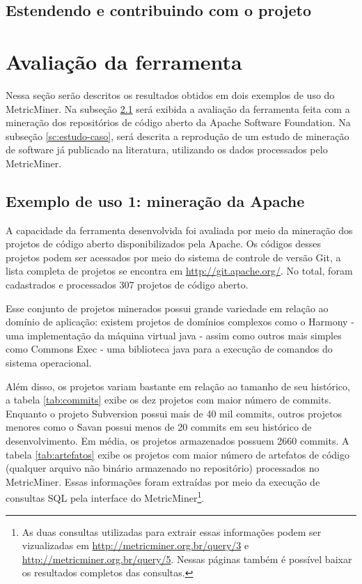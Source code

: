 \documentclass[a4paper, 12pt, twoside]{book}
\begin{document}
    \section{Estendendo e contribuindo com o projeto}

    
\chapter{Avaliação da ferramenta} \label{ch:avaliacao}
    
    Nessa seção serão descritos os resultados obtidos em dois exemplos de uso do MetricMiner. Na subseção \ref{sc:apache} será exibida a avaliação da ferramenta feita com a mineração dos repositórios de código aberto da Apache Software Foundation. Na subseção \ref{sc:estudo-caso}, será descrita a reprodução de um estudo de mineração de software já publicado na literatura, utilizando os dados processados pelo MetricMiner.

    \section{Exemplo de uso 1: mineração da Apache} \label{sc:apache}

        A capacidade da ferramenta desenvolvida foi avaliada por meio da mineração dos projetos de código aberto disponibilizados pela Apache. Os códigos desses projetos podem ser acessados por meio do sistema de controle de versão Git, a lista completa de projetos se encontra em \url{http://git.apache.org/}. No total, foram cadastrados e processados 307 projetos de código aberto.

        Esse conjunto de projetos minerados possui grande variedade em relação ao domínio de aplicação: existem projetos de domínios complexos como o Harmony - uma implementação da máquina virtual java - assim como outros mais simples como Commons Exec - uma biblioteca java para a execução de comandos do sistema operacional. 

        Além disso, os projetos variam bastante em relação ao tamanho de seu histórico, a tabela \ref{tab:commits} exibe os dez projetos com maior número de commits. Enquanto o projeto Subversion possui mais de 40 mil commits, outros projetos menores como o Savan possui menos de 20 commits em seu histórico de desenvolvimento. Em média, os projetos armazenados possuem 2660 commits. A tabela \ref{tab:artefatos} exibe os projetos com maior número de artefatos de código (qualquer arquivo não binário armazenado no repositório) processados no MetricMiner. Essas informações foram extraídas por meio da execução de consultas SQL pela interface do MetricMiner\footnote{As duas consultas utilizadas para extrair essas informações podem ser vizualizadas em \url{http://metricminer.org.br/query/3} e \url{http://metricminer.org.br/query/5}. Nessas páginas também é possível baixar os resultados completos das consultas.}.
\end{document}
